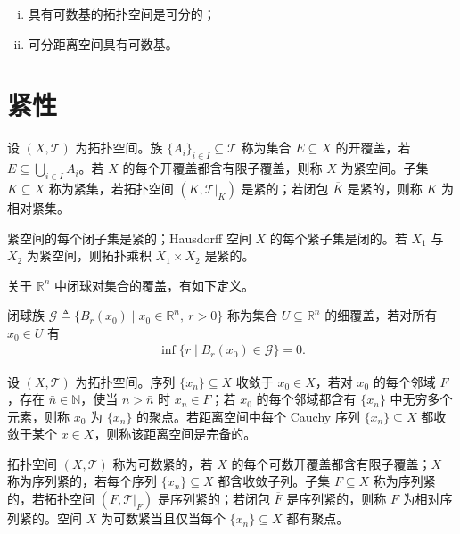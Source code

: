 \documentclass[../main.tex]{subfiles}
\begin{document}
\begin{proposition}\label{proposition:appA-基可分}\label{proposition:appA-紧可分}
\begin{enumerate}[(i)]
\item 具有可数基的拓扑空间是可分的；
\item 可分距离空间具有可数基。
\end{enumerate}
\end{proposition}

\section{紧性}\label{section:appA-紧性}

\begin{definition}[开覆盖与紧集]\label{definition:appA-紧性}
设 $(X,\mathscr{T})$ 为拓扑空间。族 $\{A_i\}_{i\in I}\subseteq\mathscr{T}$ 称为集合 $E\subseteq X$ 的开覆盖，若 $E\subseteq\bigcup_{i\in I}A_i$。若 $X$ 的每个开覆盖都含有限子覆盖，则称 $X$ 为紧空间。子集 $K\subseteq X$ 称为紧集，若拓扑空间 $(K,\mathscr{T}|_K)$ 是紧的；若闭包 $\overline{K}$ 是紧的，则称 $K$ 为相对紧集。
\end{definition}

紧空间的每个闭子集是紧的；Hausdorff 空间 $X$ 的每个紧子集是闭的。若 $X_1$ 与 $X_2$ 为紧空间，则拓扑乘积 $X_1\times X_2$ 是紧的。

关于 $\mathbb{R}^n$ 中闭球对集合的覆盖，有如下定义。

\begin{definition}[细覆盖]\label{definition:appA-细覆盖}
闭球族 $\mathscr{G}\triangleq \{B_r(x_0)\mid x_0\in\mathbb{R}^n,\ r>0\}$ 称为集合 $U\subseteq\mathbb{R}^n$ 的细覆盖，若对所有 $x_0\in U$ 有
\begin{align*}
\inf\{r\mid B_r(x_0)\in\mathscr{G}\}=0.
\end{align*}
\end{definition}

\begin{definition}[收敛、聚点与完备距离空间]\label{definition:appA-收敛聚点}
设 $(X,\mathscr{T})$ 为拓扑空间。序列 $\{x_n\}\subseteq X$ 收敛于 $x_0\in X$，若对 $x_0$ 的每个邻域 $F$，存在 $\bar n\in\mathbb{N}$，使当 $n>\bar n$ 时 $x_n\in F$；若 $x_0$ 的每个邻域都含有 $\{x_n\}$ 中无穷多个元素，则称 $x_0$ 为 $\{x_n\}$ 的聚点。若距离空间中每个 Cauchy 序列 $\{x_n\}\subseteq X$ 都收敛于某个 $x\in X$，则称该距离空间是完备的。
\end{definition}

\begin{definition}[可数紧与序列紧]\label{definition:appA-可数序列紧}
拓扑空间 $(X,\mathscr{T})$ 称为可数紧的，若 $X$ 的每个可数开覆盖都含有限子覆盖；$X$ 称为序列紧的，若每个序列 $\{x_n\}\subseteq X$ 都含收敛子列。子集 $F\subseteq X$ 称为序列紧的，若拓扑空间 $(F,\mathscr{T}|_F)$ 是序列紧的；若闭包 $\overline{F}$ 是序列紧的，则称 $F$ 为相对序列紧的。空间 $X$ 为可数紧当且仅当每个 $\{x_n\}\subseteq X$ 都有聚点。
\end{definition}
\end{document}
